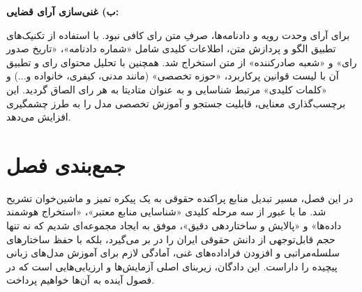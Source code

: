 \documentclass[12pt,a4paper]{report}
\begin{document}
	\textbf{ب) غنی‌سازی آرای قضایی:}
	
	برای آرای وحدت رویه و دادنامه‌ها، صرفِ متن رای کافی نبود. با استفاده از تکنیک‌های تطبیق الگو و پردازش متن، اطلاعات کلیدی شامل «شماره دادنامه»، «تاریخ صدور رای» و «شعبه صادرکننده» از متن استخراج شد. همچنین با تحلیل محتوای رای و تطبیق آن با لیست قوانین پرکاربرد، «حوزه تخصصی» (مانند مدنی، کیفری، خانواده و...) و «کلمات کلیدی» مرتبط شناسایی و به عنوان متادیتا به هر رای الصاق گردید. این برچسب‌گذاری معنایی، قابلیت جستجو و آموزش تخصصی مدل را به طرز چشمگیری افزایش می‌دهد.
	
	\section{جمع‌بندی فصل}
	
	در این فصل، مسیر تبدیل منابع پراکنده حقوقی به یک پیکره تمیز و ماشین‌خوان تشریح شد. ما با عبور از سه مرحله کلیدی «شناسایی منابع معتبر»، «استخراج هوشمند داده‌ها» و «پالایش و ساختاردهی دقیق»، موفق به ایجاد مجموعه‌ای شدیم که نه تنها حجم قابل‌توجهی از دانش حقوقی ایران را در بر می‌گیرد، بلکه با حفظ ساختارهای سلسله‌مراتبی و افزودن فراداده‌های غنی، آمادگی لازم برای آموزش مدل‌های زبانی پیچیده را داراست. این دادگان، زیربنای اصلی آزمایش‌ها و ارزیابی‌هایی است که در فصول آینده به آن‌ها خواهیم پرداخت.
	
\end{document}
